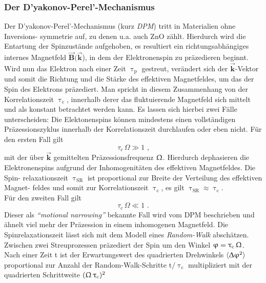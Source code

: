 \subsubsection{Der D'yakonov-Perel'-Mechanismus}
\label{DPM}
Der D'yakonov-Perel'-Mechanismus (kurz \textit{DPM}) \cite{Dyakonov.1971} tritt in Materialien ohne Inversions- symmetrie auf, zu denen u.a. auch ZnO zählt. Hierdurch wird die Entartung der Spinzustände aufgehoben, es resultiert ein richtungsabhängiges internes Magnetfeld $\vec{\textbf{B}}(\vec{\textbf{k}}$), in dem der Elektronenspin zu präzedieren beginnt. Wird nun das Elektron nach einer Zeit $\uptau_\text{p}$ gestreut, verändert sich der $\vec{\textbf{k}}$-Vektor und somit die Richtung und die Stärke des effektiven Magnetfeldes, um das der Spin des Elektrons präzediert\cite{Zutic.2004}. Man spricht in diesem Zusammenhang von der Korrelationszeit $\uptau_\text{c}$, innerhalb derer das fluktuierende Magnetfeld sich mittelt und als konstant betrachtet werden kann. Es lassen sich hierbei zwei Fälle unterscheiden: Die Elektonenspins können mindestens einen vollständigen Präzessionszyklus innerhalb der Korrelationszeit durchlaufen oder eben nicht.
Für den ersten Fall gilt
\begin{equation}
\tau_c \,\Omega \gg 1 \text{ ,}
\end{equation}
mit der über $\vec{\textbf{k}}$ gemittelten Präzessionsfrequenz $\Upomega$. Hierdurch dephasieren die Elektronenspins aufgrund der Inhomogenitäten des effektiven Magnetfeldes. Die Spin- relaxationszeit $\uptau_\text{SR}$ ist proportional zur Breite der Verteilung des effektiven Magnet- feldes und somit zur Korrelationszeit $\uptau_\text{c}$, es gilt $\uptau_\text{SR} \approx \uptau_\text{c}$.\\ %
Für den zweiten Fall gilt
\begin{equation}
\tau_c \,\Omega \ll 1 \text{ .}
\end{equation}
Dieser als \textit{``motional narrowing''} bekannte Fall wird vom DPM beschrieben und \mbox{ähnelt} viel mehr der Präzession in einem inhomogenen Magnetfeld. Die Spinrelaxationszeit lässt sich mit dem Modell eines \textit{Random-Walk} abschätzen. Zwischen zwei Streuprozessen präzediert der Spin um den Winkel $\upvarphi=\uptau_\text{c} \, \Upomega$. Nach einer Zeit t ist der Erwartungswert des quadrierten Drehwinkels $\Braket{\Updelta\upvarphi^\text{2}}$ proportional zur Anzahl der Random-Walk-Schritte $\text{t}/\uptau_\text{c}$ multipliziert mit der quadrierten Schrittweite $(\Upomega\, \uptau_\text{c})^\text{2}$
